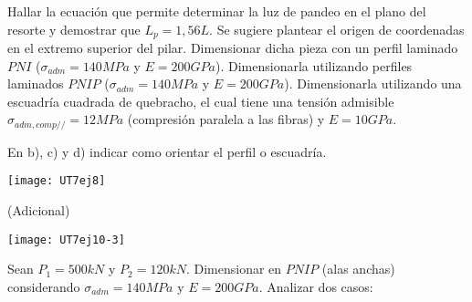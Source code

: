 \parte Hallar la ecuación que permite determinar la luz de pandeo en el plano del resorte y demostrar que $L_p=1,56L$. Se sugiere plantear el origen de coordenadas en el extremo superior del pilar.
\parte Dimensionar dicha pieza con un perfil laminado $PNI$ ($\sigma_{adm}=140MPa$ y $E=200GPa$).
\parte Dimensionarla utilizando perfiles laminados $PNIP$ ($\sigma_{adm}=140MPa$ y $E=200GPa$). 
\parte Dimensionarla utilizando una escuadría cuadrada de quebracho, el cual tiene una tensión admisible $\sigma_{adm,comp//}=12MPa$ (compresión paralela a las fibras) y $E=10GPa$.

En b), c) y d) indicar como orientar el perfil o escuadría.

\begin{center}
\texttt{[image: UT7ej8]}
\end{center}


\ejercicio (Adicional)

\begin{center}
\texttt{[image: UT7ej10-3]}
\end{center}

Sean $P_1=500 kN$ y $P_2=120 kN$. Dimensionar en $PNIP$ (alas anchas) considerando $\sigma_{adm}=140MPa$ y $E=200GPa$. Analizar dos casos:

\begin{figure}[htb]
	\centering
\subfloat[Caso 1]{
\texttt{[image: UT7ej10-1]}
	\label{fig:UT710.1}}
~
\subfloat[Caso 2]{
\texttt{[image: UT7ej10-2]}
	\label{fig:UT710.2}}
\caption{}
	\label{fig:UT710}
\end{figure}
